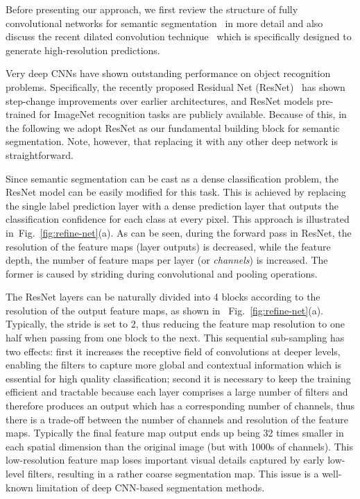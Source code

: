 \documentclass[10pt,twocolumn,letterpaper]{article}
\newcommand{\Fig}{Fig.\xspace}
\begin{document}
Before presenting our approach, we first review the structure of fully convolutional networks for semantic segmentation~\cite{LongSD14} in more detail and also discuss the recent dilated convolution technique~\cite{ChenPK0Y16} which is specifically designed to generate high-resolution predictions.

Very deep CNNs
have shown outstanding performance on object recognition problems.
Specifically, the recently proposed Residual Net (ResNet)~\cite{He:2016:ResNet} has shown step-change improvements over earlier architectures, and ResNet models pre-trained for ImageNet recognition tasks are publicly available.
%
Because of this, in the following we adopt ResNet as our fundamental building block for semantic segmentation. Note, however, that replacing it with any other deep network is straightforward.

Since semantic segmentation can be cast as a dense classification problem, the ResNet model can be easily modified for this task.
%
This is achieved by replacing the single label prediction layer with a dense prediction layer that outputs the classification confidence for each class at every pixel.
This approach is illustrated in~\Fig~\ref{fig:refine-net}(a).
%
As can be seen, during the forward pass in ResNet, the resolution of the feature maps (layer outputs) is decreased, while the feature depth, \ie the number of feature maps per layer (or {\em channels}) is increased.
The former is caused by striding during convolutional and pooling operations.

The ResNet layers can be naturally divided into 4 blocks according to the resolution of the output feature maps, as shown in ~\Fig~\ref{fig:refine-net}(a).
Typically, the stride is set to 2, thus reducing the feature map resolution to one half when passing from one block to the next. This sequential sub-sampling has two effects: first it increases the receptive field of convolutions at deeper levels, enabling the filters to capture more global and contextual information which is essential for high quality classification; second it is necessary to keep the training efficient and tractable because each layer comprises a large number of filters and therefore produces an output which has a corresponding number of channels, thus there is a trade-off between the number of channels and resolution of the feature maps. Typically the final feature map output ends up being 32 times smaller in each spatial dimension than the original image (but with 1000s of channels). 
This low-resolution feature map loses important visual details captured by early low-level filters, resulting in a rather coarse segmentation map.
This issue is a well-known limitation of deep CNN-based segmentation methods. 
\end{document}

